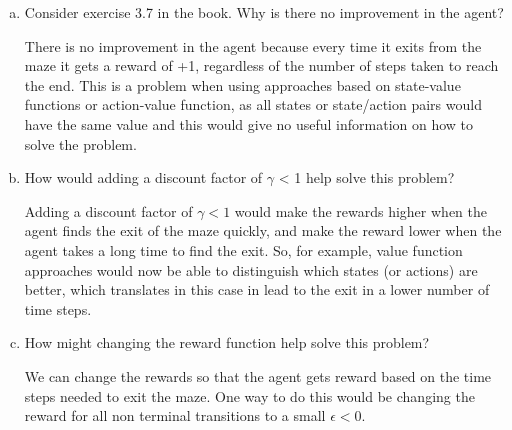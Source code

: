 \documentclass{exam}
\begin{document}
\begin{problem}
\begin{enumerate}
\begin{enumerate}[(a)]
    \item Consider exercise 3.7 in the book. Why is there no improvement in the agent?
        \begin{solutionorlines}[2in]
        There is no improvement in the agent because every time it exits from the maze it gets a reward of +1, regardless of the number of steps taken to reach the end. This is a problem when using approaches based on state-value functions or action-value function, as all states or state/action pairs would have the same value and this would give no useful information on how to solve the problem.
    \end{solutionorlines}
    \item How would adding a discount factor of $\gamma$ < 1 help solve this problem?
            \begin{solutionorlines}[2in]
        Adding a discount factor of $\gamma < 1$  would make the rewards higher when the agent finds the exit of the maze quickly, and make the reward lower when the agent takes a long time to find the exit. So, for example, value function approaches would now be able to distinguish which states (or actions) are better, which translates in this case in lead to the exit in a lower number of time steps.
    \end{solutionorlines}
    \item How might changing the reward function help solve this problem?
    \begin{solutionorlines}[2in]
        We can change the rewards so that the agent gets reward based on the time steps needed to exit the maze. One way to do this would be changing the reward for all non terminal transitions to a small $\epsilon < 0$.
    \end{solutionorlines}
    \end{enumerate}
    \end{enumerate}
\end{problem}

\end{document}
